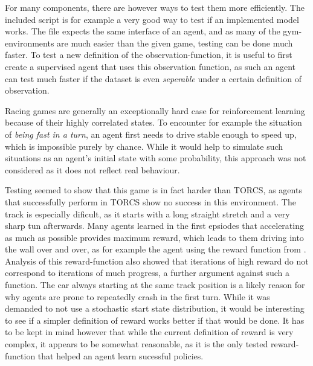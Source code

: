 For many components, there are however ways to test them more efficiently. The included  script is for example a very good way to test if an implemented model works. The file expects the same interface of an agent, and as many of the gym-environments are much easier than the given game, testing can be done much faster. To test a new definition of the observation-function, it is useful to first create a supervised agent that uses this observation function, as such an agent can test much faster if the dataset is even \textit{seperable} under a certain definition of observation.

Racing games are generally an exceptionally hard case for reinforcement learning because of their highly correlated states. To encounter for example the situation of \textit{being fast in a turn}, an agent first needs to drive stable enough to speed up, which is impossible purely by chance. While it would help to simulate such situations as an agent's initial state with some probability, this approach was not considered as it does not reflect real behaviour.

Testing seemed to show that this game is in fact harder than TORCS, as agents that successfully perform in TORCS show no success in this environment. The track is especially dificult, as it starts with a long straight stretch and a very sharp tun afterwards. Many agents learned in the first epsiodes that accelerating as much as possible provides maximum reward, which leads to them driving into the wall over and over, as for example the agent using the reward function from \cite{lillicrap_continuous_2015}. Analysis of this reward-function also showed that iterations of high reward do not correspond to iterations of much progress, a further argument against such a function. The car always starting at the same track position is a likely reason for why agents are prone to repeatedly crash in the first turn. While it was demanded to not use a stochastic start state distribution, it would be interesting to see if a simpler definition of reward works better if that would be done. It has to be kept in mind however that while the current definition of reward is very complex, it appears to be somewhat reasonable, as it is the only tested reward-function that helped an agent learn sucessful policies.

